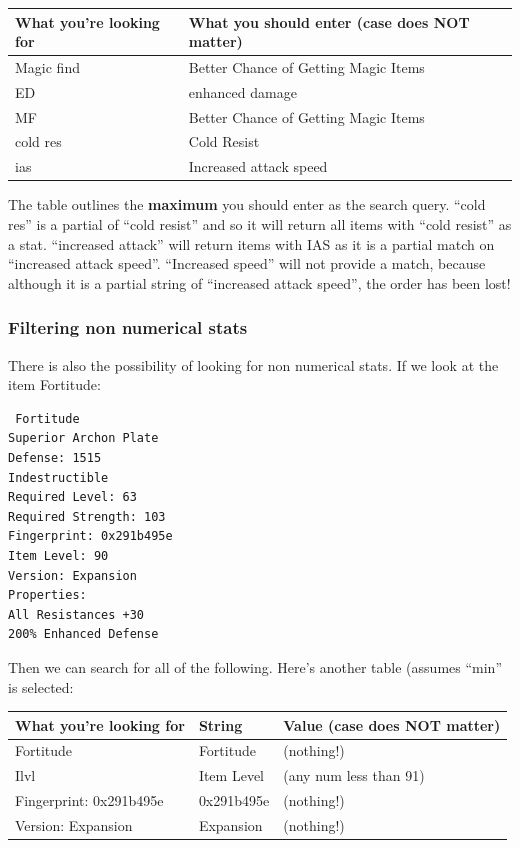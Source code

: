 \documentclass[a4paper,10pt]{article}
\begin{document}
\begin{table}[h]
\begin{center}
\begin{tabular}{l|p{3.8in}}
What you're looking for & What you should enter (case does \textbf{NOT} matter)\\
\hline
Magic find & Better Chance of Getting Magic Items\\
ED & enhanced damage\\
MF & Better Chance of Getting Magic Items\\
cold res & Cold Resist \\
ias & Increased attack speed\\
\end{tabular}
\end{center}
\end{table}

The table outlines the \textbf{maximum} you should enter as the search query. ``cold res'' is a partial of ``cold resist'' and so it will return all items with ``cold resist'' as a stat. ``increased attack'' will return items with IAS as it is a partial match on ``increased attack speed''. ``Increased speed'' will not provide a match, because although it is a partial string of ``increased attack speed'', the order has been lost!

\subsubsection{Filtering non numerical stats}

There is also the possibility of looking for non numerical stats. If we look at the item Fortitude:


\begin{verbatim}
 Fortitude
Superior Archon Plate
Defense: 1515
Indestructible
Required Level: 63
Required Strength: 103
Fingerprint: 0x291b495e
Item Level: 90
Version: Expansion
Properties: 
All Resistances +30
200% Enhanced Defense
\end{verbatim}

Then we can search for all of the following. Here's another table (assumes ``min'' is selected:

\begin{table}[h]
\begin{center}
\begin{tabular}{l|l|l}
What you're looking for & String & Value (case does \textbf{NOT} matter)\\
\hline
Fortitude & Fortitude & (nothing!) \\
Ilvl & Item Level & (any num less than 91)\\
Fingerprint: 0x291b495e & 0x291b495e & (nothing!)\\
Version: Expansion & Expansion & (nothing!)\\
\end{tabular}
\end{center}
\end{table}
\end{document}
